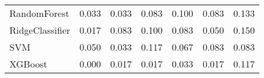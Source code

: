 \begin{tabular}{lllllll}
                   RandomForest & 0.033 &                     0.033 &                 0.083 &                  0.100 &                                   0.083 &     0.133 \\
                RidgeClassifier & 0.017 &                     0.083 &                 0.100 &                  0.083 &                                   0.050 &     0.150 \\
                            SVM & 0.050 &                     0.033 &                 0.117 &                  0.067 &                                   0.083 &     0.083 \\
                        XGBoost & 0.000 &                     0.017 &                 0.017 &                  0.033 &                                   0.017 &     0.117 \\
\bottomrule
\end{tabular}
